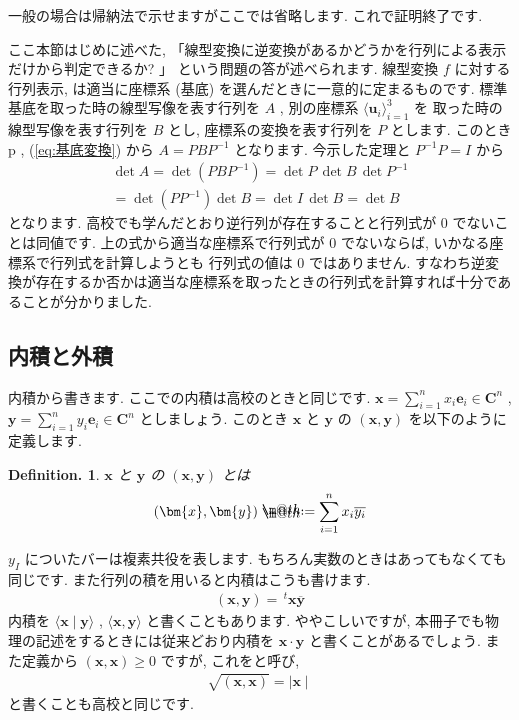 \documentclass[openany, a4paper, oneside]{jsbook}
\makeatletter
\newcommand*{\defeq}{\mathrel{\rlap{%
\raisebox{0.3ex}{$\m@th\cdot$}}%
\raisebox{-0.3ex}{$\m@th\cdot$}}%
=}
\theoremstyle{break}
\theoremstyle{breakdefn}
\newtheorem{defn}[thm]{Definition.}
\makeatother
\begin{document}
一般の場合は帰納法で示せますがここでは省略します.
これで証明終了です.

ここ本節はじめに述べた, 「線型変換に逆変換があるかどうかを行列による表示だけから判定できるか? 」
という問題の答が述べられます.
線型変換 $f$ に対する行列表示, は適当に座標系 (基底) を選んだときに一意的に定まるものです.
標準基底を取った時の線型写像を表す行列を $A$ , 別の座標系 $\langle \bm{u}_i \rangle _{i=1}^3$ を
取った時の線型写像を表す行列を $B$ とし,
座標系の変換を表す行列を $P$ とします.
このとき p \pageref{eq:基底変換}, (\ref{eq:基底変換}) から $A = P B P^{-1}$ となります.
今示した定理と $P^{-1} P = I$ から
    \begin{gather}
        \det A
        =
        \det ( P B P^{-1} )
        =
        \det P \, \det B \, \det P^{-1} \\
        =
        \det ( P P^{-1} ) \det B
        =
        \det I \, \det B
        =
        \det B
    \end{gather}
となります.
高校でも学んだとおり逆行列が存在することと行列式が $0$ でないことは同値です.
上の式から適当な座標系で行列式が $0$ でないならば, いかなる座標系で行列式を計算しようとも
行列式の値は $0$ ではありません.
すなわち逆変換が存在するか否かは適当な座標系を取ったときの行列式を計算すれば十分であることが分かりました.
\subsection{内積と外積}


内積から書きます.
ここでの内積は高校のときと同じです.
$\bm{x}= \sum_{i=1}^n x_{i}\bm{e}_{i} \in \bm{C}^n$  , $\bm{y} = \sum_{i=1}^n y_{i}\bm{e}_{i} \in \bm{C}^n$ としましょう.
このとき $\bm{x}$ と $\bm{y}$ の $(\bm{x}, \bm{y})$ を以下のように定義します.
\begin{defn} $\bm{x}$ と $\bm{y}$ の $(\bm{x}, \bm{y})$ とは
\begin{align}
(\bm{x}, \bm{y} ) \defeq \sum_{i=1}^n x_{i} \overline {y_{i}}
\end{align}
\end{defn}
$y_{I}$ についたバーは複素共役を表します.
もちろん実数のときはあってもなくても同じです.
また行列の積を用いると内積はこうも書けます.
    \begin{align}
        (\bm{x},\bm{y}) = \, ^{t}\bm{x} \overline{\bm{y}}
    \end{align}
内積を $\langle \bm{x} \mid \bm{y} \rangle$ ,  $\langle \bm{x},\bm{y} \rangle$ と書くこともあります.
ややこしいですが, 本冊子でも物理の記述をするときには従来どおり内積を $\bm{x} \cdot \bm{y}$ と書くことがあるでしょう.
また定義から $(\bm{x},\bm{x})\geq 0$ ですが, これをと呼び,
    \begin{align}
        \sqrt{(\bm{x},\bm{x})}=\mid \bm{x} \mid
    \end{align}
と書くことも高校と同じです.
\end{document}
